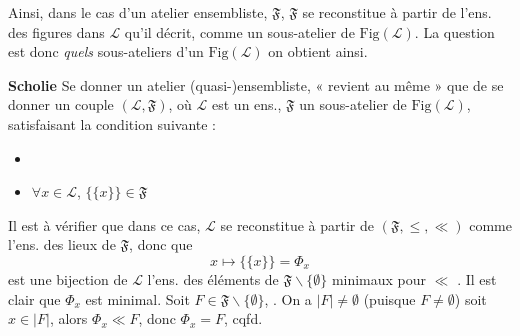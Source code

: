 \documentclass[11pt,a4paper]{article}
\begin{document}
Ainsi, dans le cas d'un atelier ensembliste, $\mathfrak{F}$, $\mathfrak{F}$ se reconstitue à partir de l'ens. des figures dans $\mathcal{L}$ qu'il décrit, comme un sous-atelier de $\mathrm{Fig}(\mathcal{L})$. La question est donc \emph{quels} sous-ateliers d'un $\mathrm{Fig}(\mathcal{L})$ on obtient ainsi.

\textbf{Scholie} Se donner un atelier (quasi-)ensembliste, « revient au même » que de se donner un couple $(\mathcal{L}, \mathfrak{F})$, où $\mathcal{L}$ est un ens., $\mathfrak{F}$ un sous-atelier de $\mathrm{Fig}(\mathcal{L})$, satisfaisant la condition suivante :
\begin{itemize}
  \item[] 
  \item[\emph{Atens*1}] \struck{\ill{}} $\forall x \in \mathcal{L}$, $\lbrace \lbrace x \rbrace \rbrace \in \mathfrak{F}$
\end{itemize}

 Il \struck{\ill{}} est à vérifier que dans ce cas, $\mathcal{L}$ se reconstitue à partir de $(\mathfrak{F}, \leq, \ll)$ comme l'ens. des lieux de $\mathfrak{F}$, donc que
\[
  x \longmapsto \lbrace \lbrace x \rbrace \rbrace = \Phi_x
\]
est une bijection de $\mathcal{L}$   l'ens. des éléments de $\mathfrak{F} \smallsetminus \lbrace \emptyset \rbrace$ minimaux pour $\ll$ . Il est clair que $\Phi_x$ est minimal.  Soit $F \in \mathfrak{F} \smallsetminus \lbrace \emptyset \rbrace$, .  On a $|F| \neq \emptyset$ (puisque $F \neq \emptyset$) soit $x \in |F|$, alors $\Phi_x \ll F$, donc $\Phi_x = F$, cqfd.
\end{document}
